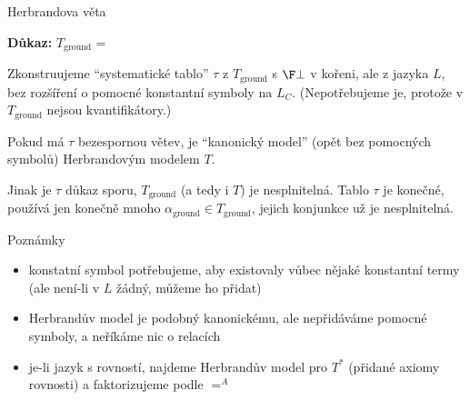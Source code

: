 \documentclass{beamer}
\begin{document}
\begin{frame}{Herbrandova věta}

    \pause 
    
    \textbf{Důkaz:}
        \alert{$T_\text{ground}$} = 

        \vspace{-3pt}
        \pause 

        Zkonstruujeme \alert{``systematické tablo''} $\tau$ z $T_\text{ground}$ s $\F\bot$ v kořeni, ale z jazyka $L$, bez rozšíření o pomocné konstantní symboly na $L_C$. \pause  (Nepotřebujeme je, protože v $T_\text{ground}$ nejsou kvantifikátory.)
        
        \pause 
        Pokud má $\tau$ bezespornou větev, je \alert{``kanonický model''} (opět bez pomocných symbolů) Herbrandovým modelem $T$. 
        
        \pause 
        Jinak je $\tau$ \alert{důkaz sporu}, $T_\text{ground}$ (a tedy i $T$) je nesplnitelná. Tablo $\tau$ je konečné, používá jen konečně mnoho $\alpha_\text{ground}\in T_\text{ground}$, jejich konjunkce už je nesplnitelná.\hfill\qedsymbol
    
\end{frame}


\begin{frame}{Poznámky}

    \pause
    \begin{itemize}[<+->]
        \item konstatní symbol potřebujeme, aby existovaly vůbec nějaké konstantní termy (ale není-li v $L$ žádný, můžeme ho přidat)
        \item Herbrandův model je podobný kanonickému, ale nepřidáváme pomocné symboly, a neříkáme nic o relacích
        \item je-li jazyk s rovností, najdeme Herbrandův model pro $T^*$ (přidané axiomy rovnosti) a faktorizujeme podle $=^A$
    \end{itemize}

\end{frame}
\end{document}

